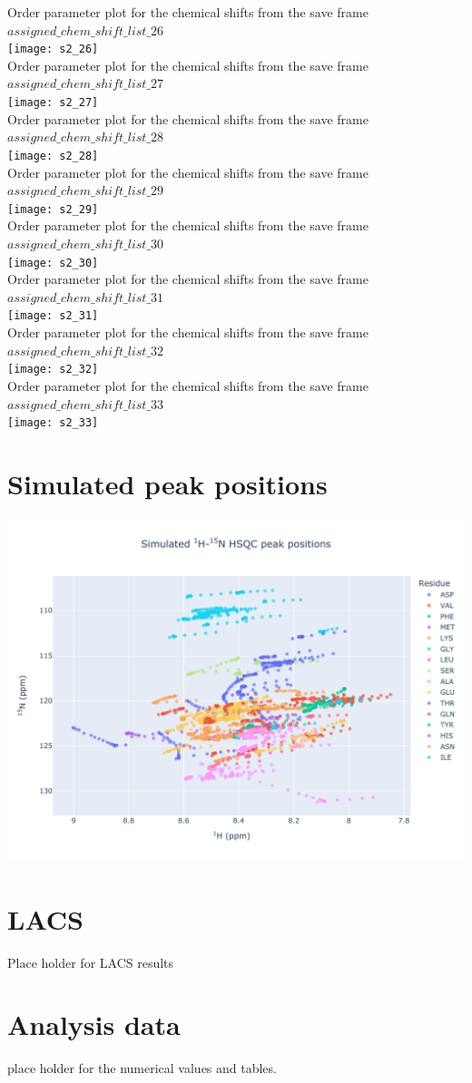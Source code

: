Order parameter plot for the chemical shifts from the  save frame $assigned\_chem\_shift\_list\_26$\\ \texttt{[image: s2\_26]}\\
Order parameter plot for the chemical shifts from the  save frame $assigned\_chem\_shift\_list\_27$\\ \texttt{[image: s2\_27]}\\
Order parameter plot for the chemical shifts from the  save frame $assigned\_chem\_shift\_list\_28$\\ \texttt{[image: s2\_28]}\\
Order parameter plot for the chemical shifts from the  save frame $assigned\_chem\_shift\_list\_29$\\ \texttt{[image: s2\_29]}\\
Order parameter plot for the chemical shifts from the  save frame $assigned\_chem\_shift\_list\_30$\\ \texttt{[image: s2\_30]}\\
Order parameter plot for the chemical shifts from the  save frame $assigned\_chem\_shift\_list\_31$\\ \texttt{[image: s2\_31]}\\
Order parameter plot for the chemical shifts from the  save frame $assigned\_chem\_shift\_list\_32$\\ \texttt{[image: s2\_32]}\\
Order parameter plot for the chemical shifts from the  save frame $assigned\_chem\_shift\_list\_33$\\ \texttt{[image: s2\_33]}\\

\section{Simulated peak positions}
\includegraphics[width=18cm]{18857_n15.pdf}\\

\section{LACS}
Place holder for LACS results
\section{Analysis data}
place holder for the numerical values and tables.
